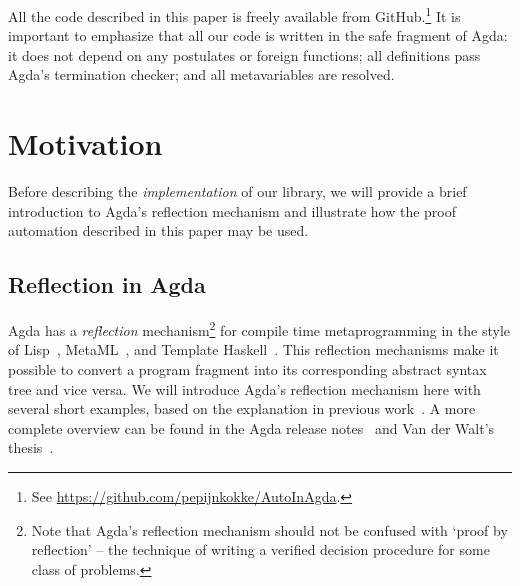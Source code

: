 \documentclass[preprint]{sigplanconf}
\begin{document}
All the code described in this paper is freely available from
GitHub.\footnote{
  See \url{https://github.com/pepijnkokke/AutoInAgda}.
} It is important to emphasize that all our code
is written in the safe fragment of Agda: it does not depend on any
postulates or foreign functions; all definitions pass Agda's
termination checker; and all metavariables are resolved.


\section{Motivation}
\label{sec:motivation}

Before describing the \emph{implementation} of our library, we will
provide a brief introduction to Agda's reflection mechanism and
illustrate how the proof automation described in this paper may be
used.

\subsection*{Reflection in Agda}

Agda has a \emph{reflection} mechanism\footnote{Note that Agda's
  reflection mechanism should not be confused with `proof by
  reflection' -- the technique of writing a verified decision
  procedure for some class of problems.} for compile time
metaprogramming in the style of Lisp~\cite{lisp-macros},
MetaML~\cite{metaml}, and Template
Haskell~\cite{template-haskell}. This reflection mechanisms make it
possible to convert a program fragment into its corresponding abstract
syntax tree and vice versa. We will introduce Agda's reflection
mechanism here with several short examples, based on the explanation
in previous work~\cite{van-der-walt}. A more complete overview can be
found in the Agda release notes~\cite{agda-relnotes-228} and Van der
Walt's thesis~\cite{vdWalt:Thesis:2012}.
\end{document}
